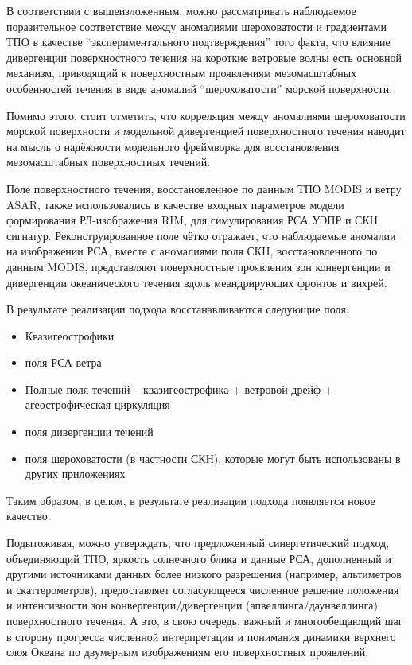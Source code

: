 В соответствии с вышеизложенным, можно рассматривать наблюдаемое поразительное соответствие между аномалиями шероховатости и градиентами ТПО в качестве ``экспериментального подтверждения'' того факта, что влияние дивергенции поверхностного течения на короткие ветровые волны есть основной механизм, приводящий к поверхностным проявлениям мезомасштабных особенностей течения в виде аномалий ``шероховатости'' морской поверхности. 

Помимо этого, стоит отметить, что корреляция между аномалиями шероховатости морской поверхности и модельной дивергенцией поверхностного течения наводит на мысль о надёжности модельного фреймворка для восстановления мезомасштабных поверхностных течений.

Поле поверхностного течения, восстановленное по данным ТПО MODIS и ветру ASAR, также использовались в качестве входных параметров модели формирования РЛ-изображения RIM, для симулирования РСА УЭПР и СКН сигнатур. Реконструированное поле чётко отражает, что наблюдаемые аномалии на изображении РСА, вместе с аномалиями поля СКН, восстановленного по данным MODIS, представляют поверхностные проявления зон конвергенции и дивергенции океанического течения вдоль меандрирующих фронтов и вихрей.

В результате реализации подхода восстанавливаются следующие поля:

\begin{itemize}
	\itemsep0em
	\item Квазигеострофики
	\item поля РСА-ветра
	\item Полные поля течений -- квазигеострофика + ветровой дрейф + агеострофическая циркуляция
	\item поля дивергенции течений
	\item поля шероховатости (в частности СКН), которые могут быть использованы в других приложениях
\end{itemize}

Таким образом, в целом, в результате реализации подхода появляется новое качество.

Подытоживая, можно утверждать, что предложенный синергетический подход, объединяющий ТПО, яркость солнечного блика и данные РСА, дополненный и другими источниками данных более низкого разрешения (например, альтиметров и скаттерометров), предоставляет согласующееся численное решение положения и интенсивности зон конвергенции/дивергенции (апвеллинга/даунвеллинга) поверхностного течения. А это, в свою очередь, важный и многообещающий шаг в сторону прогресса численной интерпретации и понимания динамики верхнего слоя Океана по двумерным изображениям его поверхностных проявлений.

\clearpage